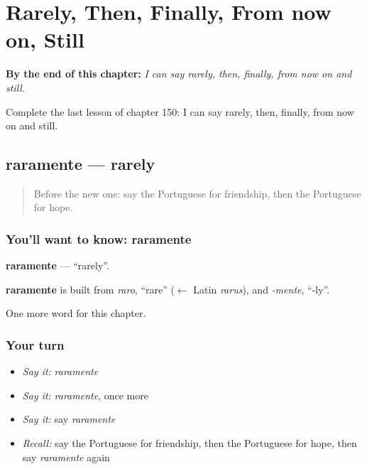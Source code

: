 
\chapter{Rarely, Then, Finally, From now on, Still}
\label{ch:pt-rarely-then-finally-from-now-on-still}

\begin{chapteropening}
\textbf{By the end of this chapter:} \emph{I can say rarely, then, finally, from now on and still.}

Complete the last lesson of chapter 150: I can say rarely, then, finally, from now on and still.
\end{chapteropening}

\section[raramente]{raramente — rarely}

\label{lesson:PT-C150-raramente}



\begin{quote}
Before the new one: say the Portuguese for friendship, then the Portuguese for hope.
\end{quote}

\subsection*{You'll want to know: raramente}
\textbf{raramente} — \textquotedblleft{}rarely\textquotedblright{}.

\begin{cousinweb}
\textbf{raramente} is built from \emph{raro}, \textquotedblleft{}rare\textquotedblright{} ($\leftarrow$ Latin \emph{rarus}), and \emph{-mente}, \textquotedblleft{}-ly\textquotedblright{}.
\end{cousinweb}

\begin{grammarlens}[title={What you've built}]
One more word for this chapter.
\end{grammarlens}

\subsection*{Your turn}
\begin{itemize}
\raggedright
  \item \emph{Say it:} \emph{raramente}
  \item \emph{Say it:} \emph{raramente}, once more
  \item \emph{Say it:} say \emph{raramente}
  \item \emph{Recall:} say the Portuguese for friendship, then the Portuguese for hope, then say \emph{raramente} again
\end{itemize}

